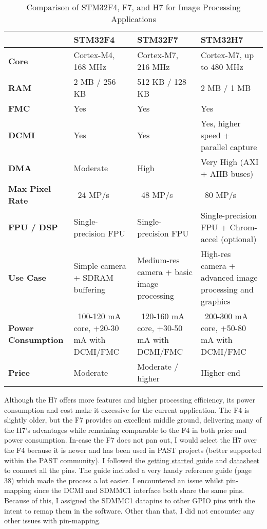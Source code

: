 \documentclass[10pt]{article}
\newcommand{\nl}{\newline \newline}
\begin{document}
\begin{table}[H]
    \centering
    \begin{tabular}{|p{2.5cm}|p{4cm}|p{4cm}|p{4cm}|}
    \hline
    \textbf{} & \textbf{STM32F4} & \textbf{STM32F7} & \textbf{STM32H7} \\
    \hline
    \textbf{Core} & Cortex-M4, 168 MHz & Cortex-M7, 216 MHz & Cortex-M7, up to 480 MHz \\
    \hline
    \textbf{RAM} & 2 MB / 256 KB & 512 KB / 128 KB & 2 MB / 1 MB \\
    \hline
    \textbf{FMC} & Yes & Yes & Yes \\
    \hline
    \textbf{DCMI} & Yes & Yes & Yes, higher speed + parallel capture \\
    \hline
    \textbf{DMA} & Moderate & High & Very High (AXI + AHB buses) \\
    \hline
    \textbf{Max Pixel Rate} & ~24 MP/s & ~48 MP/s & ~80 MP/s \\
    \hline
    \textbf{FPU / DSP} & Single-precision FPU & Single-precision FPU & Single-precision FPU + Chrom-accel (optional) \\
    \hline
    \textbf{Use Case} & Simple camera + SDRAM buffering & Medium-res camera + basic image processing & High-res camera + advanced image processing and graphics \\
    \hline
    \textbf{Power Consumption} & ~100-120 mA core, +20-30 mA with DCMI/FMC & ~120-160 mA core, +30-50 mA with DCMI/FMC & ~200-300 mA core, +50-80 mA with DCMI/FMC \\
    \hline
    \textbf{Price} & Moderate & Moderate / higher & Higher-end \\
    \hline
    \end{tabular}
    \caption{Comparison of STM32F4, F7, and H7 for Image Processing Applications}
    \label{tab:stm32-dcmi-breakdown}
\end{table}

Although the H7 offers more features and higher processing efficiency, its power consumption and cost make it excessive for the current application.
The F4 is slightly older, but the F7 provides an excellent middle ground, delivering many of the H7's advantages while remaining comparable to the F4 in both price and power consumption.
In-case the F7 does not pan out, I would select the H7 over the F4 because it is newer and has been used in PAST projects (better supported within the PAST community).
\nl
I followed the \href{https://www.st.com/resource/en/application_note/dm00164549-getting-started-with-stm32f7-series-mcu-hardware-development-stmicroelectronics.pdf}{getting started guide} and \href{https://www.st.com/resource/en/datasheet/stm32f750n8.pdf}{datasheet} to connect all the pins. The guide included a very handy reference guide (page 38) which made the process a lot easier.
I encountered an issue whilst pin-mapping since the DCMI and SDMMC1 interface both share the same pins. Because of this, I assigned the SDMMC1 datapins to other GPIO pins with the intent to remap them in the software. Other than that, I did not encounter any other issues with pin-mapping.
\end{document}

